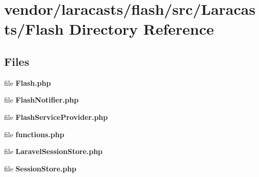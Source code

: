 \section{vendor/laracasts/flash/src/\+Laracasts/\+Flash Directory Reference}
\label{dir_a61970ab48959e3c80b2a511db476990}
\subsection*{Files}
\begin{DoxyCompactItemize}
\item 
file {\bf Flash.\+php}
\item 
file {\bf Flash\+Notifier.\+php}
\item 
file {\bf Flash\+Service\+Provider.\+php}
\item 
file {\bf functions.\+php}
\item 
file {\bf Laravel\+Session\+Store.\+php}
\item 
file {\bf Session\+Store.\+php}
\end{DoxyCompactItemize}
